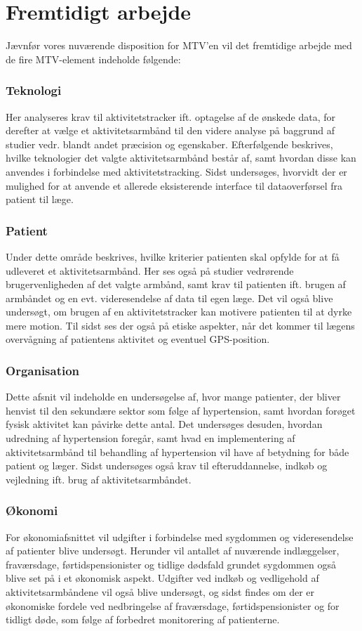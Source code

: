 \section{Fremtidigt arbejde}

Jævnfør vores nuværende disposition for MTV'en vil det fremtidige arbejde med de fire MTV-element indeholde følgende: 

\subsubsection{Teknologi}
Her analyseres krav til aktivitetstracker ift. optagelse af de ønskede data, for derefter at vælge et aktivitetsarmbånd til den videre analyse på baggrund af studier vedr. blandt andet præcision og egenskaber. Efterfølgende beskrives, hvilke teknologier det valgte aktivitetsarmbånd består af, samt hvordan disse kan anvendes i forbindelse med aktivitetstracking. Sidst undersøges, hvorvidt der er mulighed for at anvende et allerede eksisterende interface til dataoverførsel fra patient til læge.

\subsubsection{Patient}
Under dette område beskrives, hvilke kriterier patienten skal opfylde for at få udleveret et aktivitetsarmbånd. Her ses også på studier vedrørende brugervenligheden af det valgte armbånd, samt krav til patienten ift. brugen af armbåndet og en evt. videresendelse af data til egen læge. Det vil også blive undersøgt, om brugen af en aktivitetstracker kan motivere patienten til at dyrke mere motion. Til sidst ses der også på etiske aspekter, når det kommer til lægens overvågning af patientens aktivitet og eventuel GPS-position.

\subsubsection{Organisation}
Dette afsnit vil indeholde en undersøgelse af, hvor mange patienter, der bliver henvist til den sekundære sektor som følge af hypertension, samt hvordan forøget fysisk aktivitet kan påvirke dette antal. Det undersøges desuden, hvordan udredning af hypertension foregår, samt hvad en implementering af aktivitetsarmbånd til behandling af hypertension vil have af betydning for både patient og læger. Sidst undersøges også krav til efteruddannelse, indkøb og vejledning ift. brug af aktivitetsarmbåndet.

\subsubsection{Økonomi}
For økonomiafsnittet vil udgifter i forbindelse med sygdommen og videresendelse af patienter blive undersøgt. Herunder vil antallet af nuværende indlæggelser, fraværsdage, førtidspensionister og tidlige dødsfald grundet sygdommen også blive set på i et økonomisk aspekt. Udgifter ved indkøb og vedligehold af aktivitetsarmbåndene vil også blive undersøgt, og sidst findes om der er økonomiske fordele ved nedbringelse af fraværsdage, førtidspensionister og for tidligt døde, som følge af forbedret monitorering af patienterne. 